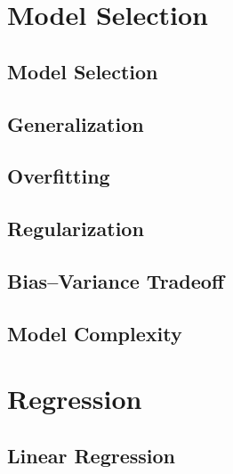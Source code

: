 \documentclass[18pt,a3paper,landscape, ncols=2]{cheatsheet}
\begin{document}
\section{Model Selection} \seperator
	\subsection{Model Selection}
		\begin{mdframed}
		\end{mdframed}
	\subsection{Generalization}
		\begin{mdframed}
		\end{mdframed}	
	\subsection{Overfitting}
		\begin{mdframed}
		\end{mdframed}
	\subsection{Regularization}
		\begin{mdframed}
		\end{mdframed}
	\subsection{Bias--Variance Tradeoff}
		\begin{mdframed}
		\end{mdframed}
	\subsection{Model Complexity}
		\begin{mdframed}
		\end{mdframed}

\vfill\null %
\columnbreak %

\section{Regression} \seperator
	\subsection{Linear Regression}
		\begin{mdframed}
		\end{mdframed}
\end{document}
